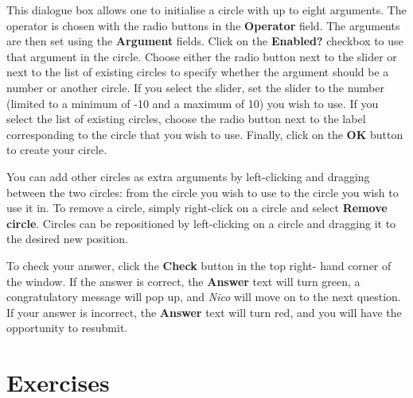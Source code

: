 \documentclass[14pt]{article}
\begin{document}
This dialogue box allows one to initialise a circle with up to eight arguments.
The operator is chosen with the radio buttons in the {\bf {\sffamily Operator}}
field.  The arguments are then set using the {\bf {\sffamily Argument}} fields.
Click on the {\bf {\sffamily Enabled?}} checkbox to use that argument in the
circle.  Choose either the radio button next to the slider or next to the list
of existing circles to specify whether the argument should be a number or
another circle.  If you select the slider, set the slider to the number (limited
to a minimum of -10 and a maximum of 10) you wish to use.  If you select the
list of existing circles, choose the radio button next to the label corresponding
to the circle that you wish to use.  Finally, click on the {\bf {\sffamily OK}}
button to create your circle.

You can add other circles as extra arguments by left-clicking and dragging between
the two circles: from the circle you wish to use to the circle you wish to use it
in.  To remove a circle, simply right-click on a circle and select
{\bf {\sffamily Remove circle}}.  Circles can be repositioned by left-clicking on
a circle and dragging it to the desired new position.

To check your answer, click the {\bf {\sffamily Check}} button in the top right-
hand corner of the window.  If the answer is correct, the {\bf {\sffamily Answer}}
text will turn green, a congratulatory message will pop up, and \emph{Nico} will
move on to the next question.  If your answer is incorrect, the
{\bf {\sffamily Answer}} text will turn red, and you will have the opportunity
to resubmit.

\section*{Exercises}
\end{document}
